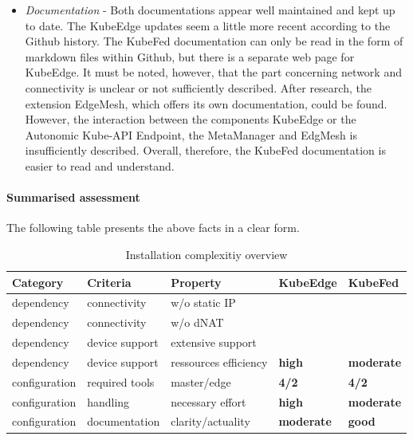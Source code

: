 \documentclass[MSC,Master,english]{twbook}%
\newcommand{\cmark}{\ding{51}}%
\newcommand{\xmark}{\ding{55}}%
\begin{document}
\begin{itemize}
    \item \textit{Documentation}  - Both documentations appear well maintained and kept up to date. The KubeEdge updates seem a little more recent according to the Github history. The KubeFed documentation can only be read in the form of markdown files within Github, but there is a separate web page for KubeEdge. It must be noted, however, that the part concerning network and connectivity is unclear or not sufficiently described. After research, the extension EdgeMesh, which offers its own documentation, could be found. However, the interaction between the components KubeEdge or the Autonomic Kube-API Endpoint, the MetaManager and EdgMesh is insufficiently described. Overall, therefore, the KubeFed documentation is easier to read and understand.
\end{itemize}

\paragraph{Summarised assessment} The following table presents the above facts in a clear form.  
\begin{table}[ht]
    \begin{center}
        \begin{tabular}{|l|l|l|l|l|}
            \hline
            Category & Criteria & Property & \textbf{KubeEdge} & \textbf{KubeFed} \\
            \hline
            dependency & connectivity  & w/o static \ac{IP} & \cmark & \xmark \\
            dependency & connectivity  & w/o dNAT & \cmark & \xmark \\
            dependency & device support & extensive support & \cmark & \cmark \\
            dependency & device support & ressources efficiency & \textbf{high} & \textbf{moderate} 
            \\
            configuration & required tools & master/edge & \textbf{4/2} & \textbf{4/2} \\
            configuration & handling & necessary effort & \textbf{high} & \textbf{moderate} \\
            configuration & documentation & clarity/actuality & \textbf{moderate} & \textbf{good} \\
            \hline
        \end{tabular}
        \caption{Installation complexitiy overview}
        \label{tab:install-overview}
    \end{center}
\end{table}
\end{document}
